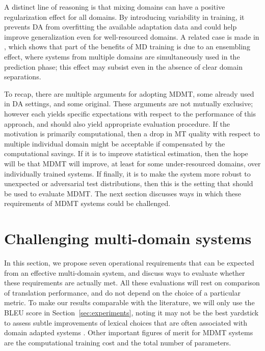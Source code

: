 \documentclass[11pt,a4paper]{article}
\newcommand{\fyDone}[1]{\done[FY]\Todo[FY:]{\textcolor{orange}{#1}}}
\begin{document}
A distinct line of reasoning is that mixing domains can have a positive regularization effect for all domains. By introducing variability in training, it prevents DA from overfitting the available adaptation data and could help improve generalization even for well-resourced domains. A related case is made in \cite{Joshi12multidomain}, which shows that part of the benefits of MD training is due to an ensembling effect, where systems from multiple domains are simultaneously used in the prediction phase; this effect may subsist even in the absence of clear domain separations.

\fyDone{recap}
To recap, there are multiple arguments for adopting MDMT, some already used in DA settings, and some original. These arguments are not mutually exclusive; however each yields specific expectations with respect to the performance of this approach, and should also yield appropriate evaluation procedure. If the motivation is primarily computational, then a drop in MT quality with respect to multiple individual domain might be acceptable if compensated by the computational savings. If it is to improve statistical estimation, then the hope will be that MDMT will improve, at least for some under-resourced domains, over individually trained systems. If finally, it is to make the system more robust to unexpected or adversarial test distributions, then this is the setting that should be used to evaluate MDMT. The next section discusses ways in which these requirements of MDMT systems could be challenged. 

\section{Challenging multi-domain systems \label{sec:challenging}}
In this section, we propose seven\fyDone{check number} operational requirements that can be expected from an effective multi-domain system, and discuss ways to evaluate whether these requirements are actually met. All these evaluations will rest on comparison of translation performance, and do not depend on the choice of a particular metric. To make our results comparable with the literature, we will only use the BLEU score \cite{Papineni02bleu} in Section~\ref{sec:experiments}, noting it may not be the best yardstick to assess subtle improvements of lexical choices that are often associated with domain adapted systems \cite{Irvine13measuring}. Other important figures of merit for MDMT systems are the computational training cost and the total number of parameters.\fyDone{Insert discussion about scores}
\end{document}
